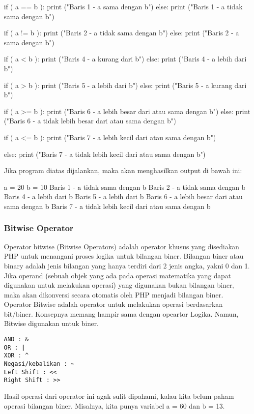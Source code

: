 \begin{eqation}
\begin{verbartim}
if ( a == b ):
   print ("Baris 1 - a sama dengan b")
else:
   print ("Baris 1 - a tidak sama dengan b")

if ( a != b ):
   print ("Baris 2 - a tidak sama dengan b")
else:
   print ("Baris 2 - a sama dengan b")

if ( a < b ):
   print ("Baris 4 - a kurang dari b") 
else:
   print ("Baris 4 - a lebih dari b")

if ( a > b ):
   print ("Baris 5 - a lebih dari b") 
else:
   print ("Baris 5 - a kurang dari b")

if ( a >= b ):
   print ("Baris 6 - a lebih besar dari atau sama dengan b") 
else:
   print ("Baris 6 - a tidak lebih besar dari atau sama dengan b") 

if ( a <= b ):
   print ("Baris 7 - a lebih kecil dari atau sama dengan b") 

else:
   print ("Baris 7 - a tidak lebih kecil dari atau sama dengan b")    
   
\end{verbartim}

Jika program diatas dijalankan, maka akan menghasilkan output di bawah ini:

a =  20
b =  10
Baris 1 - a tidak sama dengan b
Baris 2 - a tidak sama dengan b
Baris 4 - a lebih dari b
Baris 5 - a lebih dari b
Baris 6 - a lebih besar dari atau sama dengan b
Baris 7 - a tidak lebih kecil dari atau sama dengan b

\subsubsection{Bitwise Operator}
Operator bitwise (Bitwise Operators) adalah operator khusus yang disediakan PHP untuk menangani proses logika untuk bilangan biner. Bilangan biner atau binary adalah jenis bilangan yang hanya terdiri dari 2 jenis angka, yakni 0 dan 1. Jika operand (sebuah objek yang ada pada operasi matematika yang dapat digunakan untuk melakukan operasi) yang digunakan bukan bilangan biner, maka akan dikonversi secara otomatis oleh PHP menjadi bilangan biner. Operator Bitwise adalah operator untuk melakukan operasi berdasarkan bit/biner. Konsepnya memang hampir sama dengan opeartor Logika. Namun, Bitwise digunakan untuk biner.
\begin{verbatim}
AND : &
OR : |
XOR : ^
Negasi/kebalikan : ~
Left Shift : <<
Right Shift : >>
\end{verbatim}

Hasil operasi dari operator ini agak sulit dipahami, kalau kita belum paham operasi bilangan biner.
Misalnya, kita punya variabel a = 60 dan b = 13.


\end{eqation}
